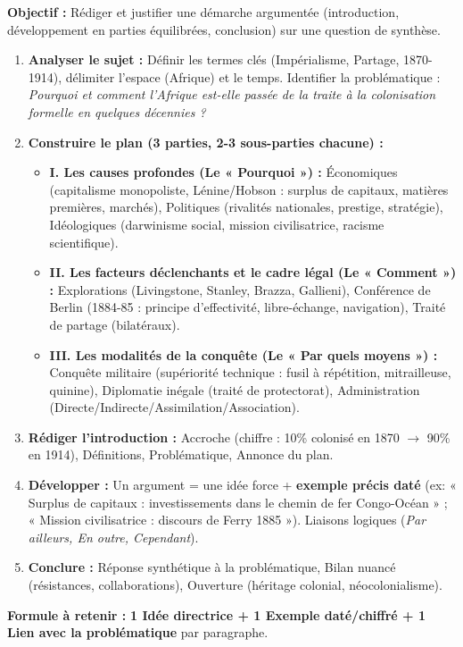 \documentclass[11pt]{article}
\begin{document}
\begin{methode}
\textbf{Objectif :} Rédiger et justifier une démarche argumentée (introduction, développement en parties équilibrées, conclusion) sur une question de synthèse.
\begin{enumerate}
    \item \textbf{Analyser le sujet :} Définir les termes clés (Impérialisme, Partage, 1870-1914), délimiter l'espace (Afrique) et le temps. Identifier la problématique : \emph{Pourquoi et comment l'Afrique est-elle passée de la traite à la colonisation formelle en quelques décennies ?}
    \item \textbf{Construire le plan (3 parties, 2-3 sous-parties chacune) :}
        \begin{itemize}
            \item \textbf{I. Les causes profondes (Le « Pourquoi ») :} Économiques (capitalisme monopoliste, Lénine/Hobson : surplus de capitaux, matières premières, marchés), Politiques (rivalités nationales, prestige, stratégie), Idéologiques (darwinisme social, mission civilisatrice, racisme scientifique).
            \item \textbf{II. Les facteurs déclenchants et le cadre légal (Le « Comment ») :} Explorations (Livingstone, Stanley, Brazza, Gallieni), Conférence de Berlin (1884-85 : principe d'effectivité, libre-échange, navigation), Traité de partage (bilatéraux).
            \item \textbf{III. Les modalités de la conquête (Le « Par quels moyens ») :} Conquête militaire (supériorité technique : fusil à répétition, mitrailleuse, quinine), Diplomatie inégale (traité de protectorat), Administration (Directe/Indirecte/Assimilation/Association).
        \end{itemize}
    \item \textbf{Rédiger l'introduction :} Accroche (chiffre : 10\% colonisé en 1870 $\to$ 90\% en 1914), Définitions, Problématique, Annonce du plan.
    \item \textbf{Développer :} Un argument = une idée force + \textbf{exemple précis daté} (ex: « Surplus de capitaux : investissements dans le chemin de fer Congo-Océan » ; « Mission civilisatrice : discours de Ferry 1885 »). Liaisons logiques (\emph{Par ailleurs, En outre, Cependant}).
    \item \textbf{Conclure :} Réponse synthétique à la problématique, Bilan nuancé (résistances, collaborations), Ouverture (héritage colonial, néocolonialisme).
\end{enumerate}
\textbf{Formule à retenir :} \textbf{1 Idée directrice + 1 Exemple daté/chiffré + 1 Lien avec la problématique} par paragraphe.
\end{methode}
\end{document}
